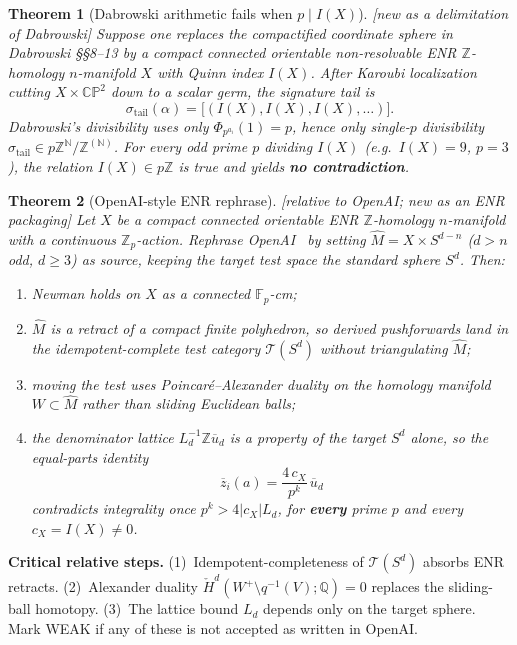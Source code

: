 \documentclass[11pt]{article}
\newtheorem{theorem}{Theorem}[section]
\theoremstyle{definition}
\newcommand{\status}[1]{\textit{\textcolor{black!70}{[#1]}}}
\begin{document}
\begin{theorem}[Dabrowski arithmetic fails when $p\mid I(X)$]
\label{thm:dabrowski-gap}
\status{new as a delimitation of Dabrowski}
Suppose one replaces the compactified coordinate sphere in Dabrowski
\S\S8--13 by a compact connected orientable non-resolvable ENR
$\mathbb{Z}$-homology $n$-manifold $X$ with Quinn index $I(X)$.  After
Karoubi localization cutting $X\times\mathbb{CP}^2$ down to a scalar germ,
the signature tail is
\[
\sigma_{\mathrm{tail}}(\alpha)=\bigl[(I(X),I(X),I(X),\ldots)\bigr].
\]
Dabrowski's divisibility uses only $\Phi_{p^{a_i}}(1)=p$, hence only
single-$p$ divisibility $\sigma_{\mathrm{tail}}\in p\mathbb{Z}^{\mathbb{N}}/\mathbb{Z}^{(\mathbb{N})}$.
For every odd prime $p$ dividing $I(X)$ (e.g.\ $I(X)=9$, $p=3$), the
relation $I(X)\in p\mathbb{Z}$ is true and yields \textbf{no contradiction}.
\end{theorem}

\begin{theorem}[OpenAI-style ENR rephrase]
\label{thm:E}
\status{relative to OpenAI; new as an ENR packaging}
Let $X$ be a compact connected orientable ENR $\mathbb{Z}$-homology
$n$-manifold with a continuous $\mathbb{Z}_p$-action.  Rephrase
OpenAI~\cite{openai2026} by setting $\widehat{M}=X\times S^{d-n}$
($d>n$ odd, $d\ge 3$) as \emph{source}, keeping the \emph{target} test space
the standard sphere $S^d$.  Then:
\begin{enumerate}[label=(\roman*)]
\item Newman holds on $X$ as a connected $\mathbb{F}_p$-cm;
\item $\widehat{M}$ is a retract of a compact finite polyhedron, so derived
pushforwards land in the idempotent-complete test category
$\mathcal{T}(S^d)$ without triangulating $\widehat{M}$;
\item moving the test uses Poincar\'e--Alexander duality on the homology
manifold $W\subset\widehat{M}$ rather than sliding Euclidean balls;
\item the denominator lattice $L_d^{-1}\mathbb{Z}\overline{u}_d$ is a
property of the \emph{target} $S^d$ alone, so the equal-parts identity
\[
\overline{z}_i(a)=\frac{4\,c_X}{p^k}\,\overline{u}_d
\]
contradicts integrality once $p^k>4|c_X|L_d$, for \textbf{every} prime $p$
and every $c_X=I(X)\neq 0$.
\end{enumerate}
\end{theorem}

\begin{checkboxenv}
\textbf{Critical relative steps.}
(1)~Idempotent-completeness of $\mathcal{T}(S^d)$ absorbs ENR retracts.
(2)~Alexander duality $\check{H}^d(W^+\setminus q^{-1}(V);\mathbb{Q})=0$
replaces the sliding-ball homotopy.
(3)~The lattice bound $L_d$ depends only on the target sphere.
Mark WEAK if any of these is not accepted as written in OpenAI.
\end{checkboxenv}
\end{document}
